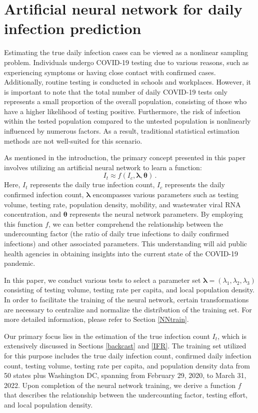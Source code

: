 \documentclass[sn-mathphys,Numbered]{sn-jnl}
\begin{document}
\section{Artificial neural network for daily infection prediction}

Estimating the true daily infection cases can be viewed as a nonlinear sampling problem. Individuals undergo COVID-19 testing due to various reasons, such as experiencing symptoms or having close contact with confirmed cases. Additionally, routine testing is conducted in schools and workplaces. However, it is important to note that the total number of daily COVID-19 tests only represents a small proportion of the overall population, consisting of those who have a higher likelihood of testing positive. Furthermore, the risk of infection within the tested population compared to the untested population is nonlinearly influenced by numerous factors. As a result, traditional statistical estimation methods are not well-suited for this scenario.


As mentioned in the introduction, the primary concept presented in this paper involves utilizing an artificial neural network to learn a function:
$$ I_{t} \approx f(I_{c}, {\bm \lambda}, {\bm \theta}) \,. $$
Here, $I_{t}$ represents the daily true infection count, $I_{c}$ represents the daily confirmed infection count, ${\bm \lambda}$ encompasses various parameters such as testing volume, testing rate, population density, mobility, and wastewater viral RNA concentration, and ${\bm \theta}$ represents the neural network parameters. By employing this function $f$, we can better comprehend the relationship between the undercounting factor (the ratio of daily true infections to daily confirmed infections) and other associated parameters. This understanding will aid public health agencies in obtaining insights into the current state of the COVID-19 pandemic.


In this paper, we conduct various tests to select a parameter set ${\bm \lambda} = (\lambda_{1}, \lambda_{2}, \lambda_{3})$ consisting of testing volume, testing rate per capita, and local population density. In order to facilitate the training of the neural network, certain transformations are necessary to centralize and normalize the distribution of the training set. For more detailed information, please refer to Section \ref{NNtrain}.

Our primary focus lies in the estimation of the true infection count $I_{t}$, which is extensively discussed in Sections \ref{backcast} and \ref{IFR}. The training set utilized for this purpose includes the true daily infection count, confirmed daily infection count, testing volume, testing rate per capita, and population density data from 50 states plus Washington DC, spanning from February 29, 2020, to March 31, 2022. Upon completion of the neural network training, we derive a function $f$ that describes the relationship between the undercounting factor, testing effort, and local population density.
\end{document}
